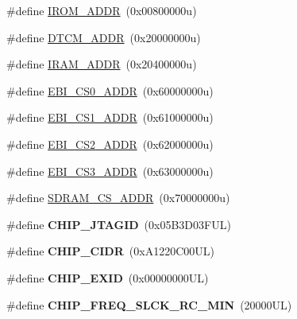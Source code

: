 \begin{DoxyCompactItemize}
\item 
\#define \mbox{\hyperlink{group__SAMV71J20__definitions_ga694212ffb8c2786bacee3d0ad6020bda}{I\+R\+O\+M\+\_\+\+A\+D\+DR}}~(0x00800000u)
\item 
\#define \mbox{\hyperlink{group__SAMV71J20__definitions_ga26626a425f7ebb3a0c2dbc276f0d9f78}{D\+T\+C\+M\+\_\+\+A\+D\+DR}}~(0x20000000u)
\item 
\#define \mbox{\hyperlink{group__SAMV71J20__definitions_gaae45ac2ef16942159481c767ac4805cf}{I\+R\+A\+M\+\_\+\+A\+D\+DR}}~(0x20400000u)
\item 
\#define \mbox{\hyperlink{group__SAMV71J20__definitions_ga9bcbb97ddae3b2cc5e2c9613d33f66b4}{E\+B\+I\+\_\+\+C\+S0\+\_\+\+A\+D\+DR}}~(0x60000000u)
\item 
\#define \mbox{\hyperlink{group__SAMV71J20__definitions_gaaddd9fdbbc77c9aced5308819f502a26}{E\+B\+I\+\_\+\+C\+S1\+\_\+\+A\+D\+DR}}~(0x61000000u)
\item 
\#define \mbox{\hyperlink{group__SAMV71J20__definitions_ga058a35f9991487dc2dd12ada792d0730}{E\+B\+I\+\_\+\+C\+S2\+\_\+\+A\+D\+DR}}~(0x62000000u)
\item 
\#define \mbox{\hyperlink{group__SAMV71J20__definitions_gad66ebdd0fc33ec3cf85dbaa14bbf05d9}{E\+B\+I\+\_\+\+C\+S3\+\_\+\+A\+D\+DR}}~(0x63000000u)
\item 
\#define \mbox{\hyperlink{group__SAMV71J20__definitions_ga61b7db25daf759c2a2beb6e5a0b57a84}{S\+D\+R\+A\+M\+\_\+\+C\+S\+\_\+\+A\+D\+DR}}~(0x70000000u)
\item 
\mbox{\label{group__SAMV71J20__definitions_gaa614519778eec0df55d3eeab3223e3f6}} 
\#define {\bfseries C\+H\+I\+P\+\_\+\+J\+T\+A\+G\+ID}~(0x05\+B3\+D03\+F\+U\+L)
\item 
\mbox{\label{group__SAMV71J20__definitions_ga1e1ae44dd9269a8a98c1d7e7a60e9fbd}} 
\#define {\bfseries C\+H\+I\+P\+\_\+\+C\+I\+DR}~(0x\+A1220\+C00\+U\+L)
\item 
\mbox{\label{group__SAMV71J20__definitions_ga35123717aa86b76bb6b73cf3adc4c2e6}} 
\#define {\bfseries C\+H\+I\+P\+\_\+\+E\+X\+ID}~(0x00000000\+U\+L)
\item 
\mbox{\label{group__SAMV71J20__definitions_ga0e868bf27426399dfdcb3a9dfc3733c4}} 
\#define {\bfseries C\+H\+I\+P\+\_\+\+F\+R\+E\+Q\+\_\+\+S\+L\+C\+K\+\_\+\+R\+C\+\_\+\+M\+IN}~(20000\+U\+L)

\end{DoxyCompactItemize}
